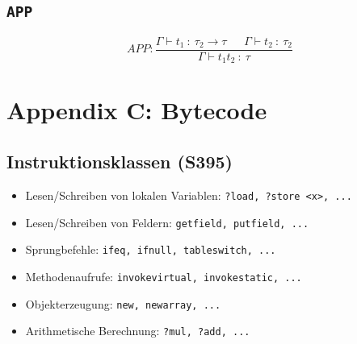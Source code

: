 \subsection{\texttt{APP}}
\[APP:\frac{\Gamma \vdash t_1~:~\tau_2 \rightarrow \tau~~~~~~~\Gamma\vdash t_2~:~\tau_2}{\Gamma\vdash t_1t_2~:~\tau}\]

\section{Appendix C: Bytecode}

\subsection{Instruktionsklassen (S395)}
\begin{itemize}
	\item Lesen/Schreiben von lokalen Variablen: \texttt{?load, ?store <x>, ...}
	\item Lesen/Schreiben von Feldern: \texttt{getfield, putfield, ...}
	\item Sprungbefehle: \texttt{ifeq, ifnull, tableswitch, ...}
	\item Methodenaufrufe: \texttt{invokevirtual, invokestatic, ...}
	\item Objekterzeugung: \texttt{new, newarray, ...}
	\item Arithmetische Berechnung: \texttt{?mul, ?add, ...}
\end{itemize}